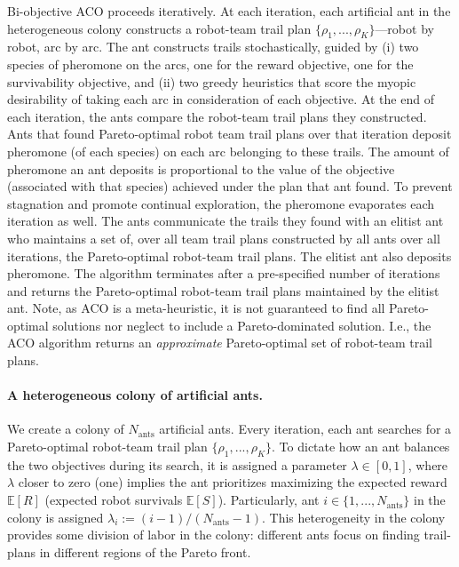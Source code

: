 \documentclass[11pt, oneside]{article}
\begin{document}
Bi-objective ACO proceeds iteratively. 
At each iteration, each artificial ant in the heterogeneous colony constructs a robot-team trail plan $\{\rho_1, ..., \rho_K\}$---robot by robot, arc by arc.
The ant constructs trails stochastically, guided by (i) two species of pheromone on the arcs, one for the reward objective, one for the survivability objective, and (ii) two greedy heuristics that score the myopic desirability of taking each arc in consideration of each objective. 
At the end of each iteration, the ants compare the robot-team trail plans they constructed. 
Ants that found Pareto-optimal robot team trail plans over that iteration deposit pheromone (of each species) on each arc belonging to these trails. The amount of pheromone an ant deposits is proportional to the value of the objective (associated with that species) achieved under the plan that ant found.
To prevent stagnation and promote continual exploration, the pheromone evaporates each iteration as well.
The ants communicate the trails they found with an elitist ant who maintains a set of, over all team trail plans constructed by all ants over all iterations, the Pareto-optimal robot-team trail plans. The elitist ant also deposits pheromone.
The algorithm terminates after a pre-specified number of iterations and returns the Pareto-optimal robot-team trail plans maintained by the elitist ant. 
Note, as ACO is a meta-heuristic, it is not guaranteed to find all Pareto-optimal solutions nor neglect to include a Pareto-dominated solution. I.e., the ACO algorithm returns an \emph{approximate} Pareto-optimal set of robot-team trail plans.

\paragraph{A heterogeneous colony of artificial ants.}
We create a colony of $N_{\text{ants}}$ artificial ants.
Every iteration, each ant searches for a Pareto-optimal robot-team trail plan $\{\rho_1, ..., \rho_K\}$.
To dictate how an ant balances the two objectives during its search, it is assigned a parameter $\lambda \in [0, 1]$, where $\lambda$ closer to zero (one) implies the ant prioritizes maximizing the expected reward $\mathbb{E}[R]$ (expected robot survivals $\mathbb{E}[S]$). 
Particularly, ant $i\in\{1, ..., N_{\text{ants}}\}$ in the colony is assigned $\lambda_i := (i-1) / (N_{\text{ants}}-1)$.
This heterogeneity in the colony provides some division of labor in the colony: different ants focus on finding trail-plans in different regions of the Pareto front. 
\end{document}
